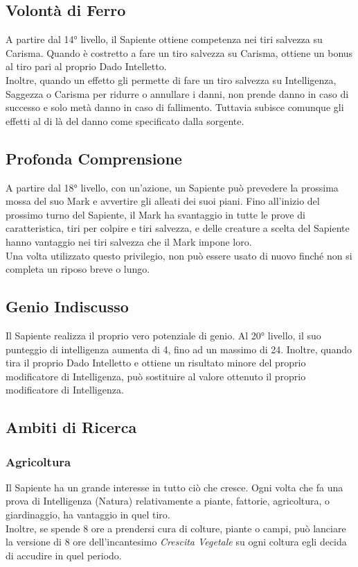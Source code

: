 \subsection{Volontà di Ferro}
A partire dal 14° livello, il Sapiente ottiene competenza nei tiri salvezza su Carisma. Quando è costretto a fare un tiro salvezza su Carisma, ottiene un bonus al tiro pari al proprio Dado Intelletto.\\
Inoltre, quando un effetto gli permette di fare un tiro salvezza su Intelligenza, Saggezza o Carisma per ridurre o annullare i danni, non prende danno in caso di successo e solo metà danno in caso di fallimento. Tuttavia subisce comunque gli effetti al di là del danno come specificato dalla sorgente.

\subsection{Profonda Comprensione}
A partire dal 18° livello, con un'azione, un Sapiente può prevedere la prossima mossa del suo Mark e avvertire gli alleati dei suoi piani. Fino all'inizio del prossimo turno del Sapiente, il Mark ha svantaggio in tutte le prove di caratteristica, tiri per colpire e tiri salvezza, e delle creature a scelta del Sapiente hanno vantaggio nei tiri salvezza che il Mark impone loro.\\
Una volta utilizzato questo privilegio, non può essere usato di nuovo finché non si completa un riposo breve o lungo.

\subsection{Genio Indiscusso}
Il Sapiente realizza il proprio vero potenziale di genio. Al 20° livello, il suo punteggio di intelligenza aumenta di 4, fino ad un massimo di 24. Inoltre, quando tira il proprio Dado Intelletto e ottiene un risultato minore del proprio modificatore di Intelligenza, può sostituire al valore ottenuto il proprio modificatore di Intelligenza.

\subsection{Ambiti di Ricerca}

\subsubsection{Agricoltura}
Il Sapiente ha un grande interesse in tutto ciò che cresce. Ogni volta che fa una prova di Intelligenza (Natura) relativamente a piante, fattorie, agricoltura, o giardinaggio, ha vantaggio in quel tiro. \\
Inoltre, se spende 8 ore a prendersi cura di colture, piante o campi, può lanciare la versione di 8 ore dell'incantesimo \textit{Crescita Vegetale} su ogni coltura egli decida di accudire in quel periodo.

